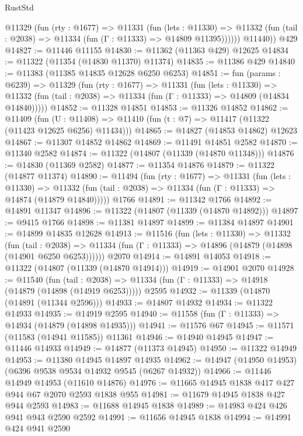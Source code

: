 \begin{lexlean}{RustStd}
\begin{coremodule}
          @11329
            (fun (rty : @1677) =>
            @11331
              (fun (lets : @11330) =>
              @11332 (fun (tail : @2038) => @11334 (fun (Γ : @11333) => @14809 @11395))))))
        @11440))
    @429
@14827 := @11446 @11155
@14830 := @11362 (@11363 @429) @12625
@14834 := @11322 (@11354 (@14830 @11370) @11374)
@14835 := @11386 @429
@14840 := @11383 (@11385 @14835 @12628 @6250 @6253)
@14851 := fun (params : @6239) =>
  @11329
    (fun (rty : @1677) =>
    @11331
      (fun (lets : @11330) =>
      @11332 (fun (tail : @2038) => @11334 (fun (Γ : @11333) => @14809 (@14834 @14840)))))
@14852 := @11328 @14851
@14853 := @11326 @14852
@14862 := @11409
    (fun (U : @11408) => @11410 (fun (t : @7) => @11417 (@11322 (@11423 @12625 @6256) @11434)))
@14865 := @14827 (@14853 @14862) @12623
@14867 := @11307 @14852 @14862
@14869 := @11491 @14851 @2582
@14870 := @11340 @2582
@14874 := @11322 (@14807 (@11339 (@14870 @11348)))
@14876 := @14830 (@11369 @2582)
@14877 := @11354 @14876
@14879 := @11322 (@14877 @11374)
@14890 := @11494
    (fun (rty : @1677) =>
    @11331
      (fun (lets : @11330) =>
      @11332 (fun (tail : @2038) => @11334 (fun (Γ : @11333) => @14874 (@14879 @14840)))))
    @1766
@14891 := @11342 @1766
@14892 := @14891 @11347
@14896 := @11322 (@14807 (@11339 (@14870 @14892)))
@14897 := @9415 @1766
@14898 := @11381 @14897
@14899 := @11384 @14897
@14901 := @14899 @14835 @12628
@14913 := @11516
    (fun (lets : @11330) =>
    @11332
      (fun (tail : @2038) =>
      @11334 (fun (Γ : @11333) => @14896 (@14879 (@14898 (@14901 @6250 @6253))))))
    @2070
@14914 := @14891 @14053
@14918 := @11322 (@14807 (@11339 (@14870 @14914)))
@14919 := @14901 @2070
@14928 := @11540
    (fun (tail : @2038) => @11334 (fun (Γ : @11333) => @14918 (@14879 (@14898 (@14919 @6253)))))
    @2595
@14932 := @11339 (@14870 (@14891 (@11344 @2596)))
@14933 := @14807 @14932
@14934 := @11322 @14933
@14935 := @14919 @2595
@14940 := @11558 (fun (Γ : @11333) => @14934 (@14879 (@14898 @14935)))
@14941 := @11576 @67
@14945 := @11571 (@11583 (@14941 @11585)) @11361
@14946 := @14940 @14945
@14947 := @11446 @14933
@14949 := @14877 (@11373 @14945)
@14950 := @11322 @14949
@14953 := @11380 @14945 @14897 @14935
@14962 := @14947 (@14950 @14953) (@6396 @9538 @9534 @14932 @9545 (@6267 @14932))
@14966 := @11446 @14949 @14953 (@11610 @14876)
@14976 := @11665 @14945 @1838 @417 @427 @944 @67 @2070 @2593 @1838 @955
@14981 := @11679 @14945 @1838 @427 @944 @2593
@14983 := @11688 @14945 @1838
@14989 := @14983 @424 @426 @941 @943 @2590 @2592
@14991 := @11656 @14945 @1838
@14994 := @14991 @424 @941 @2590

\end{coremodule}
\end{lexlean}

